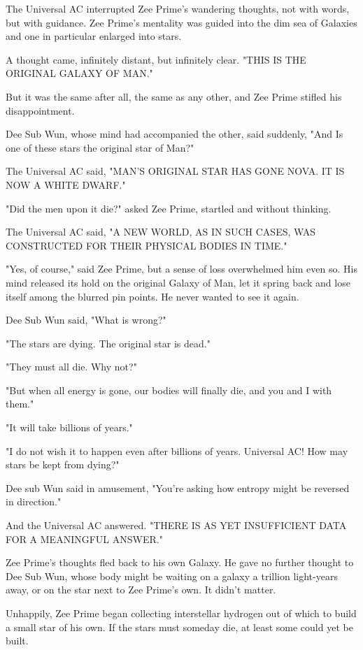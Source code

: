 \documentclass[11pt]{article}
\begin{document}
The Universal AC interrupted Zee Prime's wandering thoughts, not with words, but with guidance. Zee Prime's mentality was guided into the dim sea of Galaxies and one in particular enlarged into stars.

A thought came, infinitely distant, but infinitely clear. "THIS IS THE ORIGINAL GALAXY OF MAN."

But it was the same after all, the same as any other, and Zee Prime stifled his disappointment.

Dee Sub Wun, whose mind had accompanied the other, said suddenly, "And Is one of these stars the original star of Man?"

The Universal AC said, "MAN'S ORIGINAL STAR HAS GONE NOVA. IT IS NOW A WHITE DWARF."

"Did the men upon it die?" asked Zee Prime, startled and without thinking.

The Universal AC said, "A NEW WORLD, AS IN SUCH CASES, WAS CONSTRUCTED FOR THEIR PHYSICAL BODIES IN TIME."

"Yes, of course," said Zee Prime, but a sense of loss overwhelmed him even so. His mind released its hold on the original Galaxy of Man, let it spring back and lose itself among the blurred pin points. He never wanted to see it again.

Dee Sub Wun said, "What is wrong?"

"The stars are dying. The original star is dead."

"They must all die. Why not?"

"But when all energy is gone, our bodies will finally die, and you and I with them."

"It will take billions of years."

"I do not wish it to happen even after billions of years. Universal AC! How may stars be kept from dying?"

Dee sub Wun said in amusement, "You're asking how entropy might be reversed in direction."

And the Universal AC answered. "THERE IS AS YET INSUFFICIENT DATA FOR A MEANINGFUL ANSWER."

Zee Prime's thoughts fled back to his own Galaxy. He gave no further thought to Dee Sub Wun, whose body might be waiting on a galaxy a trillion light-years away, or on the star next to Zee Prime's own. It didn't matter.

Unhappily, Zee Prime began collecting interstellar hydrogen out of which to build a small star of his own. If the stars must someday die, at least some could yet be built.
\end{document}
